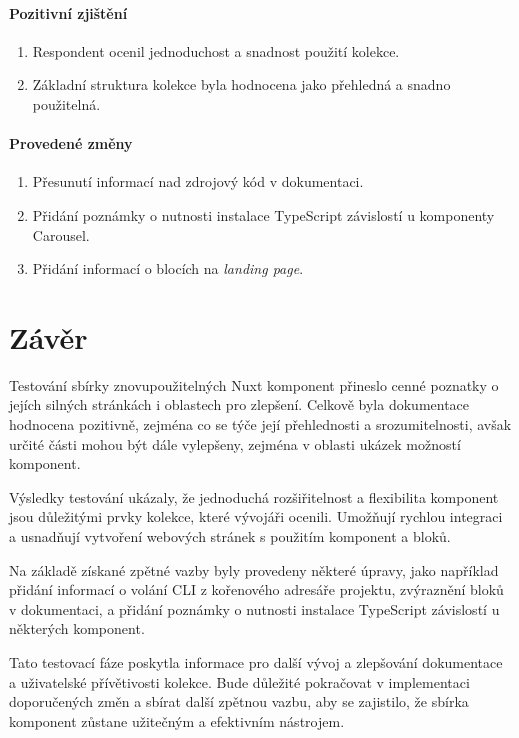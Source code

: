 \paragraph{Pozitivní zjištění}
\begin{enumerate}
  \item Respondent ocenil jednoduchost a snadnost použití kolekce.
  \item Základní struktura kolekce byla hodnocena jako přehledná a snadno použitelná.
\end{enumerate}

\paragraph{Provedené změny}
\begin{enumerate}
  \item Přesunutí informací nad zdrojový kód v dokumentaci.
  \item Přidání poznámky o nutnosti instalace TypeScript závislostí u komponenty Carousel.
  \item Přidání informací o blocích na \emph{landing page}.
\end{enumerate}

\section{Závěr}
Testování sbírky znovupoužitelných Nuxt komponent přineslo cenné poznatky o jejích silných stránkách i oblastech pro zlepšení. Celkově byla dokumentace hodnocena pozitivně, zejména co se týče její přehlednosti a srozumitelnosti, avšak určité části mohou být dále vylepšeny, zejména v oblasti ukázek možností komponent.

Výsledky testování ukázaly, že jednoduchá rozšiřitelnost a flexibilita komponent jsou důležitými prvky kolekce, které vývojáři ocenili. Umožňují rychlou integraci a usnadňují vytvoření webových stránek s použitím komponent a bloků.

Na základě získané zpětné vazby byly provedeny některé úpravy, jako například přidání informací o volání CLI z kořenového adresáře projektu, zvýraznění bloků v dokumentaci, a přidání poznámky o nutnosti instalace TypeScript závislostí u některých komponent.

Tato testovací fáze poskytla informace pro další vývoj a zlepšování dokumentace a uživatelské přívětivosti kolekce. Bude důležité pokračovat v implementaci doporučených změn a sbírat další zpětnou vazbu, aby se zajistilo, že sbírka komponent zůstane užitečným a efektivním nástrojem.
